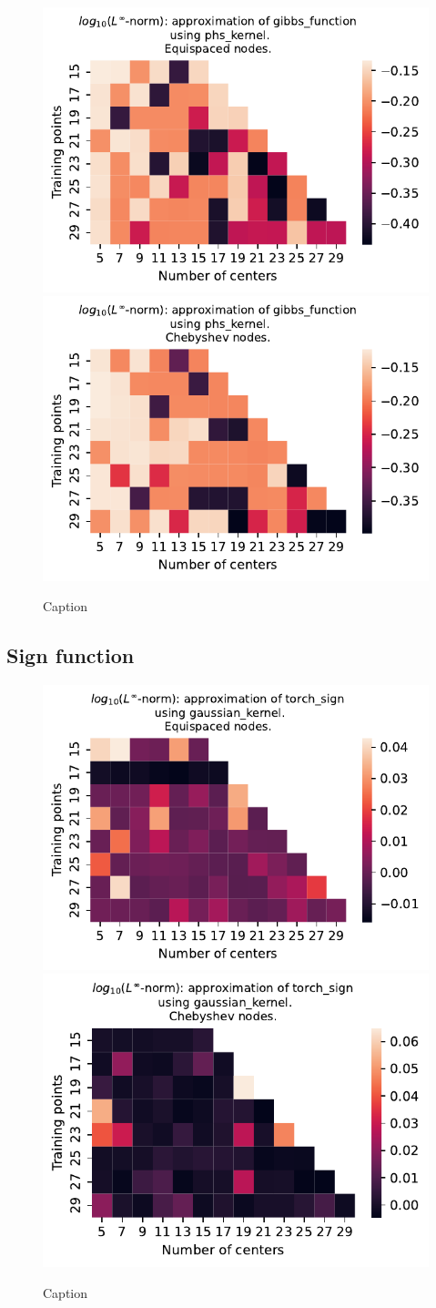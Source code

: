 \documentclass[12pt]{report} %
\begin{document}
\begin{figure}[ht]
    \centering
    
    \includegraphics[width=.49\textwidth]{imagenes/experiments/1d/variational/gibbs_function-Kphs_kernel-Equi.pdf}
    \includegraphics[width=.49\textwidth]{imagenes/experiments/1d/variational/gibbs_function-Kphs_kernel-Cheb.pdf}
    \caption{Caption}
    \label{fig:gibbs-phs}
\end{figure}


\subsection*{Sign function}

\begin{figure}[ht]
    \centering
    
    \includegraphics[width=.49\textwidth]{imagenes/experiments/1d/variational/torch_sign-Kgaussian_kernel-Equi.pdf}
    \includegraphics[width=.49\textwidth]{imagenes/experiments/1d/variational/torch_sign-Kgaussian_kernel-Cheb.pdf}
    \caption{Caption}
    \label{fig:torch-sign-gaussian}
\end{figure}
\end{document}
